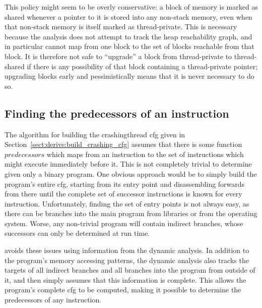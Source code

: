 This policy might seem to be overly conservative: a block of memory is
marked as shared whenever a pointer to it is stored into any non-stack
memory, even when that non-stack memory is itself marked as
thread-private.  This is necessary because the analysis does not
attempt to track the heap reachability graph, and in particular cannot
map from one block to the set of blocks reachable from that block.  It
is therefore not safe to ``upgrade'' a block from thread-private to
thread-shared if there is any possibility of that block containing a
thread-private pointer; upgrading blocks early and pessimistically
means that it is never necessary to do so.


\subsection{Finding the predecessors of an instruction}
\label{sect:program_model:instr_predecessors}


The algorithm for building the \gls{crashingthread} \gls{cfg} given in
Section~\ref{sect:derive:build_crashing_cfg} assumes that there is
some function $\mathit{predecessors}$ which maps from an instruction
to the set of instructions which might execute immediately before it.
This is not completely trivial to determine given only a binary
program.  One obvious approach would be to simply build the program's
entire \gls{cfg}, starting from its entry point and disassembling
forwards from there until the complete set of successor instructions
is known for every instruction.  Unfortunately, finding the set of
entry points is not always easy, as there can be branches into the
main program from libraries or from the operating system.  Worse, any
non-trivial program will contain indirect branches, whose successors
can only be determined at run time.

{\Implementation} avoids these issues using information from the
dynamic analysis.  In addition to the program's memory accessing
patterns, the dynamic analysis also tracks the targets of all indirect
branches and all branches into the program from outside of it, and
then simply assumes that this information is complete.  This allows
the program's complete \gls{cfg} to be computed, making it possible to
determine the predecessors of any instruction.


